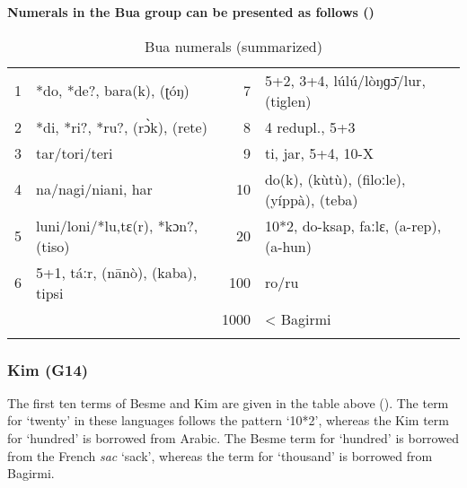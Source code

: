 {\bfseries
\textmd{Numerals in the Bua}\textmd{ group can be presented as follows ()}}

\begin{table}
\caption{\label{tab:3:110}Bua numerals (summarized)}


\begin{tabularx}{\textwidth}{llrQ}
\lsptoprule

1 & *do, *de?, bara(k), (ʈóŋ) & 7 & 5+2, 3+4, l{\'{u}}l{\'{u}}/lòŋɡ{\={ɔ}}/lur, (tiglen)\\
2 & *di, *ri?, *ru?, (r{\`{ɔ}}k), (rete) & 8 & 4 redupl., 5+3\\
3 & tar/tori/teri & 9 & ti, jar, 5+4, 10-X\\
4 & na/nagi/niani, har & 10 & do(k), (k{\`{u}}t{\`{u}}), (filoːle), (yíppà), (teba)\\
5 & luni/loni/*lu,tɛ(r), *kɔn?, (tiso) & 20 & 10*2, do-ksap, faːlɛ,  (a-rep), (a-hun)\\
6 & 5+1, táːr, (n{\={a}}nò), (kaba), tipsi & 100 & ro/ru\\
&  & 1000 & < Bagirmi\\
\lspbottomrule
\end{tabularx}
\end{table}

\subsubsection{Kim (G14)}%
The first ten terms of Besme and Kim are given in the table above (). The term for ‘twenty’ in these languages follows the pattern ‘10*2’, whereas the Kim term for ‘hundred’ is borrowed from Arabic. The Besme term for ‘hundred’ is borrowed from the French \textit{sac} ‘sack’, whereas the term for ‘thousand’ is borrowed from Bagirmi.


\clearpage 
